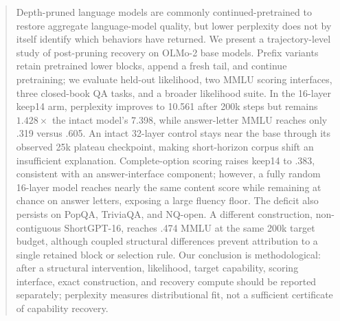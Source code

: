 \begin{abstract}
Depth-pruned language models are commonly continued-pretrained to restore
aggregate language-model quality, but lower perplexity does not by itself
identify which behaviors have returned. We present a trajectory-level study of
post-pruning recovery on OLMo-2 base models. Prefix variants retain pretrained
lower blocks, append a fresh tail, and continue pretraining; we evaluate
held-out likelihood, two MMLU scoring interfaces, three closed-book QA tasks,
and a broader likelihood suite. In the 16-layer keep14 arm, perplexity improves
to 10.561 after 200k steps but remains $1.428\times$ the intact model's 7.398,
while answer-letter MMLU reaches only .319 versus .605. An intact 32-layer
control stays near the base through its observed 25k plateau checkpoint,
making short-horizon corpus shift an insufficient explanation. Complete-option
scoring raises keep14 to .383, consistent with an answer-interface component;
however, a fully random 16-layer model reaches nearly the same content score
while remaining at chance on answer letters, exposing a large fluency floor.
The deficit also persists on PopQA, TriviaQA, and NQ-open. A different
construction, non-contiguous ShortGPT-16, reaches .474
MMLU at the same 200k target budget, although coupled structural differences
prevent attribution to a single retained block or selection rule. Our conclusion
is methodological: after a structural intervention, likelihood, target
capability, scoring interface, exact construction, and recovery compute should be
reported separately; perplexity measures distributional fit, not a sufficient
certificate of capability recovery.
\end{abstract}
